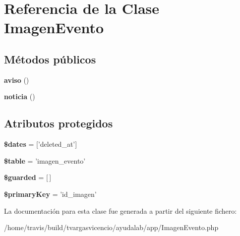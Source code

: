 \hypertarget{class_app_1_1_imagen_evento}{\section{\-Referencia de la \-Clase \-Imagen\-Evento}
\label{class_app_1_1_imagen_evento}
}
\subsection*{\-Métodos públicos}
\begin{DoxyCompactItemize}
\item 
\hypertarget{class_app_1_1_imagen_evento_a893f830558ee917f86dae4c21bc95319}{{\bfseries aviso} ()}\label{class_app_1_1_imagen_evento_a893f830558ee917f86dae4c21bc95319}

\item 
\hypertarget{class_app_1_1_imagen_evento_aa200b538a8030385bdf5c02a9f2216ad}{{\bfseries noticia} ()}\label{class_app_1_1_imagen_evento_aa200b538a8030385bdf5c02a9f2216ad}

\end{DoxyCompactItemize}
\subsection*{\-Atributos protegidos}
\begin{DoxyCompactItemize}
\item 
\hypertarget{class_app_1_1_imagen_evento_aab581066837d6296ba35c72937b6fc1c}{{\bfseries \$dates} = \mbox{[}'deleted\-\_\-at'\mbox{]}}\label{class_app_1_1_imagen_evento_aab581066837d6296ba35c72937b6fc1c}

\item 
\hypertarget{class_app_1_1_imagen_evento_ae8876a14058f368335baccf35af4a22b}{{\bfseries \$table} = 'imagen\-\_\-evento'}\label{class_app_1_1_imagen_evento_ae8876a14058f368335baccf35af4a22b}

\item 
\hypertarget{class_app_1_1_imagen_evento_a5758640ec23bdc1a6850649763244e86}{{\bfseries \$guarded} = \mbox{[}$\,$\mbox{]}}\label{class_app_1_1_imagen_evento_a5758640ec23bdc1a6850649763244e86}

\item 
\hypertarget{class_app_1_1_imagen_evento_a927b0256b942a3ee89485f2649af7981}{{\bfseries \$primary\-Key} = 'id\-\_\-imagen'}\label{class_app_1_1_imagen_evento_a927b0256b942a3ee89485f2649af7981}

\end{DoxyCompactItemize}


\-La documentación para esta clase fue generada a partir del siguiente fichero\-:\begin{DoxyCompactItemize}
\item 
/home/travis/build/tvargasvicencio/ayudalab/app/\-Imagen\-Evento.\-php\end{DoxyCompactItemize}
